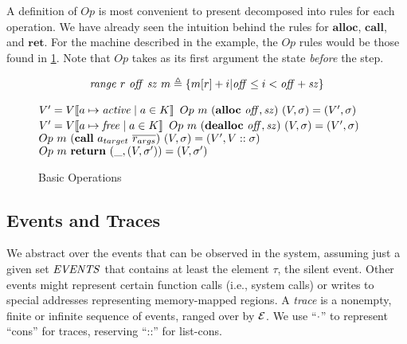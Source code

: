 \documentclass[10pt,conference]{ieeetran}%
\theoremstyle{definition}
\begin{document}
A definition of \(Op\) is most convenient to present decomposed into
rules for each operation. We have already seen the intuition behind the rules for
\(\mathbf{alloc}\), \(\mathbf{call}\), and \(\mathbf{ret}\).
For the machine described in the example, the \(Op\) rules would be those
found in \cref{fig:basicops}.
Note that \(Op\) takes as its first argument the state {\it before} the step.

\begin{figure}
    \[\mathit{range} ~ r ~ \mathit{off} ~ \mathit{sz} ~ m \triangleq
    \{m[r]+i | \mathit{off} \leq i < \mathit{off+sz}\}\]

             {\(V' = V \llbracket a \mapsto \mathit{active} \mid a \in K \rrbracket\)}
             {\(Op ~ m ~ (\mathbf{alloc} ~ \mathit{off, sz}) ~ (V,\sigma) = (V',\sigma)\)}
               {\(V' = V \llbracket a \mapsto \mathit{free} \mid a \in K \rrbracket\)}
               {\(Op ~ m ~ (\mathbf{dealloc} ~ \mathit{off, sz}) ~ (V,\sigma) = (V',\sigma)\)}
             {\(Op ~ m ~ (\mathbf{call} ~ a_{target} ~ \overline{r_{args}})
               ~ (V,\sigma) = (V',V::\sigma)\)}
    \judgment{}
             {\(Op ~ m ~ \mathbf{return} ~ (\_, (V,\sigma')) = (V, \sigma')\)}
             \caption{Basic Operations}
  \label{fig:basicops}
\end{figure}

\subsection{Events and Traces}
\label{sec:events}

We abstract over the events that can be observed in the system, assuming just
a given set \(\mathit{EVENTS}\) that contains at least the element \(\tau\), the silent
event. Other events might represent certain function calls (i.e., system calls)
or writes to special addresses representing memory-mapped regions.
A {\em trace} is a nonempty, finite or infinite sequence
of events, ranged over by \(\mathcal{E}\).
We use ``\(\cdot\)'' to represent ``cons'' for traces, reserving ``::''
for list-cons.
\end{document}
